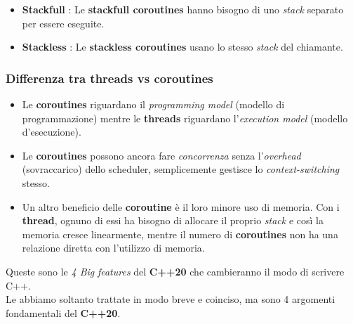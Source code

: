 \begin{itemize}
	\item \textsf{\small \textbf{Stackfull} : Le \textbf{stackfull coroutines} hanno bisogno di uno \emph{stack} separato per essere eseguite.}
	\item \textsf{\small \textbf{Stackless} : Le \textbf{stackless coroutines} usano lo stesso \emph{stack} del chiamante.}
\end{itemize}

\subsubsection{Differenza tra threads vs coroutines}

\begin{itemize}
	\item \textsf{\small Le \textbf{coroutines} riguardano il \emph{programming model} (modello di programmazione) mentre le \textbf{threads} riguardano l'\emph{execution model} (modello d'esecuzione).} \\
	\item \textsf{\small Le \textbf{coroutines} possono ancora fare \emph{concorrenza} senza l'\emph{overhead} (sovraccarico) dello scheduler, semplicemente gestisce lo \emph{context-switching} stesso.} \\
	\item \textsf{\small Un altro beneficio delle \textbf{coroutine} è il loro minore uso di memoria. Con i \textbf{thread}, ognuno di essi ha bisogno di allocare il proprio \emph{stack} e così la memoria cresce linearmente, mentre il numero di \textbf{coroutines} non ha una relazione diretta con l'utilizzo di memoria. } \\
\end{itemize}


\textsf{\small Queste sono le \emph{4 Big} \emph{features} del \textbf{C++20} che cambieranno il modo di scrivere C++.} \\

\textsf{\small Le abbiamo soltanto trattate in modo breve e coinciso, ma sono 4 argomenti fondamentali del \textbf{C++20}.} \\

